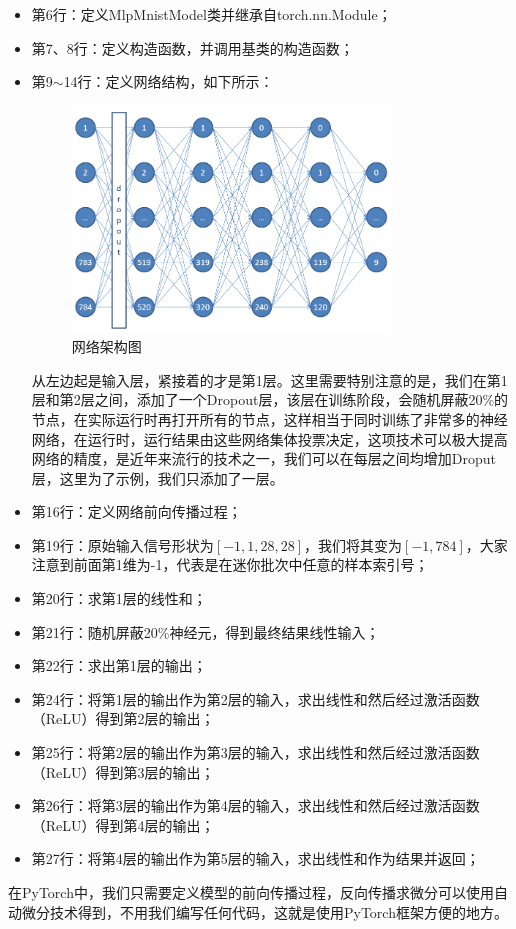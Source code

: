 \documentclass[UTF8]{article}
\begin{document}
\begin{itemize}
\item 第6行：定义MlpMnistModel类并继承自torch.nn.Module；
\item 第7、8行：定义构造函数，并调用基类的构造函数；
\item 第9$\sim$14行：定义网络结构，如下所示：
\begin{figure}[H]
	\caption{网络架构图}
	\label{f000075}
	\centering
	\includegraphics[height=6cm]{images/f000075}
\end{figure}
从左边起是输入层，紧接着的才是第1层。这里需要特别注意的是，我们在第1层和第2层之间，添加了一个Dropout层，该层在训练阶段，会随机屏蔽20\%的节点，在实际运行时再打开所有的节点，这样相当于同时训练了非常多的神经网络，在运行时，运行结果由这些网络集体投票决定，这项技术可以极大提高网络的精度，是近年来流行的技术之一，我们可以在每层之间均增加Droput层，这里为了示例，我们只添加了一层。
\item 第16行：定义网络前向传播过程；
\item 第19行：原始输入信号形状为$[-1,1,28,28]$，我们将其变为$[-1, 784]$，大家注意到前面第1维为-1，代表是在迷你批次中任意的样本索引号；
\item 第20行：求第1层的线性和；
\item 第21行：随机屏蔽20\%神经元，得到最终结果线性输入；
\item 第22行：求出第1层的输出；
\item 第24行：将第1层的输出作为第2层的输入，求出线性和然后经过激活函数（ReLU）得到第2层的输出；
\item 第25行：将第2层的输出作为第3层的输入，求出线性和然后经过激活函数（ReLU）得到第3层的输出；
\item 第26行：将第3层的输出作为第4层的输入，求出线性和然后经过激活函数（ReLU）得到第4层的输出；
\item 第27行：将第4层的输出作为第5层的输入，求出线性和作为结果并返回；
\end{itemize}
在PyTorch中，我们只需要定义模型的前向传播过程，反向传播求微分可以使用自动微分技术得到，不用我们编写任何代码，这就是使用PyTorch框架方便的地方。
\end{document}
